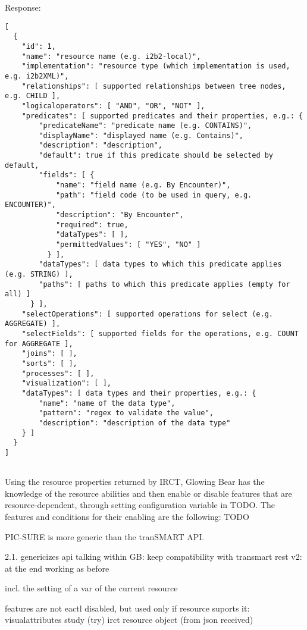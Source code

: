 Response:
\begin{verbatim}
[
  {
    "id": 1,
    "name": "resource name (e.g. i2b2-local)",
    "implementation": "resource type (which implementation is used, e.g. i2b2XML)",
    "relationships": [ supported relationships between tree nodes, e.g. CHILD ],
    "logicaloperators": [ "AND", "OR", "NOT" ],
    "predicates": [ supported predicates and their properties, e.g.: {
        "predicateName": "predicate name (e.g. CONTAINS)",
        "displayName": "displayed name (e.g. Contains)",
        "description": "description",
        "default": true if this predicate should be selected by default,
        "fields": [ {
            "name": "field name (e.g. By Encounter)",
            "path": "field code (to be used in query, e.g. ENCOUNTER)",
            "description": "By Encounter",
            "required": true,
            "dataTypes": [ ],
            "permittedValues": [ "YES", "NO" ]
          } ],
        "dataTypes": [ data types to which this predicate applies (e.g. STRING) ],
        "paths": [ paths to which this predicate applies (empty for all) ]
      } ],
    "selectOperations": [ supported operations for select (e.g. AGGREGATE) ],
    "selectFields": [ supported fields for the operations, e.g. COUNT for AGGREGATE ],
    "joins": [ ],
    "sorts": [ ],
    "processes": [ ],
    "visualization": [ ],
    "dataTypes": [ data types and their properties, e.g.: {
        "name": "name of the data type",
        "pattern": "regex to validate the value",
        "description": "description of the data type"
    } ]
  }
]
    
\end{verbatim}




Using the resource properties returned by IRCT, Glowing Bear has the knowledge of the resource abilities and then enable or disable features that are resource-dependent, through setting configuration variable in TODO.
The features and conditions for their enabling are the following:
TODO

PIC-SURE is more generic than the tranSMART API.

2.1. genericizes api talking within GB: keep compatibility with transmart rest v2: at the end working as before

incl. the setting of a var of the current resource

features are not eactl disabled, but used only if resource suports it:
visualattributes
study (try)
irct resource object (from json received)




